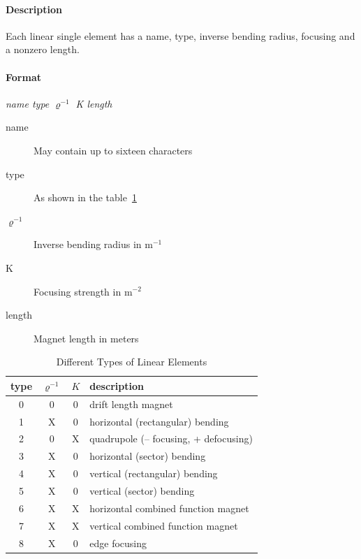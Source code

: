 \documentclass[a4paper,11pt]{report}
\begin{document}
\paragraph{Description}
Each linear single element has a name, type, inverse bending radius,
focusing and a nonzero length.

\paragraph{Format} {\em name type $ \varrho^{-1} $ K length}

\begin{description}
\item [name] May contain up to sixteen characters
\item [type] As shown in the table~\ref{T-LinEle}
\item [$ \varrho^{-1}$] Inverse bending radius in $\mathrm{m}^{-1}$
\item [K] Focusing strength in $\mathrm{m}^{-2}$
\item [length] Magnet length in meters
\end{description}

\begin{table}[h]
\caption{Different Types of Linear Elements}
\label{T-LinEle}
\scriptsize \centering
\begin{tabular}{|c|c|c|l|}
  \hline
  type & $ \varrho^{-1} $ & $K$ & description \\
  \hline
  0 & 0 & 0 & drift length magnet \\
  1 & X & 0 & horizontal (rectangular) bending \\
  2 & 0 & X & quadrupole (-- focusing, + defocusing) \\
  3 & X & 0 & horizontal (sector) bending \\
  4 & X & 0 & vertical (rectangular) bending \\
  5 & X & 0 & vertical (sector) bending \\
  6 & X & X & horizontal combined function magnet \\
  7 & X & X & vertical combined function magnet \\
  8 & X & 0 & edge focusing \\
  \hline
\end{tabular}
\normalsize
\end{table}
\end{document}
